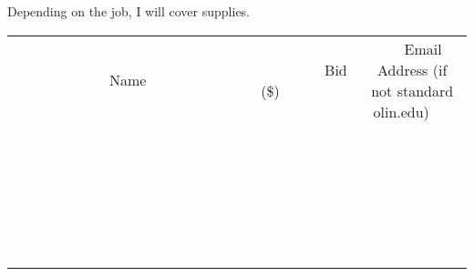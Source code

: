 \documentclass[11pt]{article}
\begin{document}
Depending on the job, I will cover supplies.
\\[6ex]
\begin{tabular}{c c c}
~~~~~~~~~~~~~Name~~~~~~~~~~~~~ & ~~~~~~~~~Bid (\$)~~~~~~~~~  & ~~~Email Address (if not standard olin.edu)~~~\\
 & & \\
\hline
 & & \\
\hline
 & & \\
\hline
 & & \\
\hline
 & & \\
\hline
 & & \\
\hline
 & & \\
\hline
 & & \\
\hline
 & & \\
\hline
 & & \\
\hline
 & & \\
\hline
 & & \\
\hline
 & & \\
\hline
 & & \\
\hline
 & & \\
\hline
 & & \\
\hline
 & & \\
\hline
 & & \\
\hline
 & & \\
\hline
 & & \\
\hline
 & & \\
\hline
 & & \\
\hline
 & & \\
\hline
 & & \\
\hline
 & & \\
\hline
 & & \\
\hline
\end{tabular}
\newpage
\end{document}
